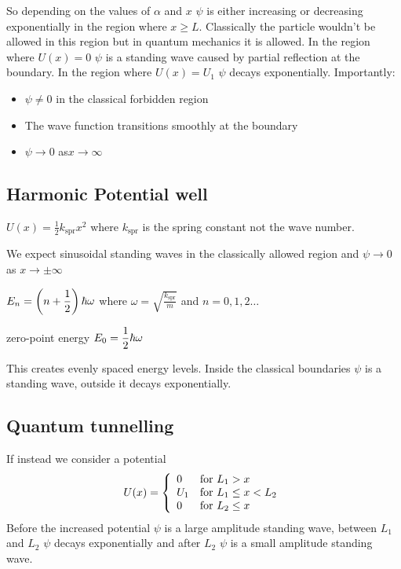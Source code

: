 So depending on the values of \(\alpha\) and \(x\) \(\psi\) is either increasing or decreasing exponentially in the region where \(x\ge L\). Classically the particle wouldn't be allowed in this region but in quantum mechanics it is allowed. In the region where \(U(x) = 0\) \(\psi\) is a standing wave caused by partial reflection at the boundary. In the region where \(U(x) = U_1\) \(\psi\) decays exponentially. Importantly:
\begin{itemize}
\item \(\psi\ne 0\) in the classical forbidden region
\item The wave function transitions smoothly at the boundary
\item \(\psi\to0\) as\(x\to\infty\)
\end{itemize}

\subsection*{Harmonic Potential well}

\(U(x)=\frac 12k_{\text{spr}}x^2\) where \(k_{\text{spr}}\) is the spring constant not the wave number.

We expect sinusoidal standing waves in the classically allowed region and \(\psi\to0\) as \(x\to\pm\infty\)

\(\displaystyle{E_n=\left(n+\frac 12\right)\hbar\omega}\) where \(\displaystyle{\omega = \sqrt{\frac{k_{\text{spr}}}{m}}}\) and \(n=0,1,2\dots\)

zero-point energy \(\displaystyle{E_0=\frac 12\hbar\omega}\)

This creates evenly spaced energy levels. Inside the classical boundaries \(\psi\) is a standing wave, outside it decays exponentially.

\subsection*{Quantum tunnelling}

If instead we consider a potential
\[U(x) = \left\{
\begin{array}{l l}
0 & \text{for } L_1>x\\
U_1 & \text{for } L_1\le x<L_2\\
0 & \text{for } L_2\le x
\end{array}
\right.\]
Before the increased potential \(\psi\) is a large amplitude standing wave, between \(L_1\) and \(L_2\) \(\psi\) decays exponentially and after \(L_2\) \(\psi\) is a small amplitude standing wave.

